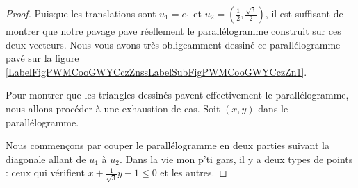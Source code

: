\begin{proof}
	Puisque les translations sont \( u_1=e_1\) et \( u_2=(\frac{ 1 }{2}, \frac{ \sqrt{ 3 } }{2})\), il est suffisant de montrer que notre pavage pave réellement le parallélogramme construit sur ces deux vecteurs. Nous vous avons très obligeamment dessiné ce parallélogramme pavé sur la figure  \ref{LabelFigPWMCooGWYCczZnssLabelSubFigPWMCooGWYCczZn1}.

	Pour montrer que les triangles dessinés pavent effectivement le parallélogramme, nous allons procéder à une exhaustion de cas. Soit \( (x,y)\) dans le parallélogramme.

	Nous commençons par couper le parallélogramme en deux parties suivant la diagonale allant de \( u_1\) à \( u_2\). Dans la vie mon p'ti gars, il y a deux types de points : ceux qui vérifient \( x+\frac{1}{ \sqrt{ 3 }}y-1\leq 0\) et les autres.


\end{proof}
